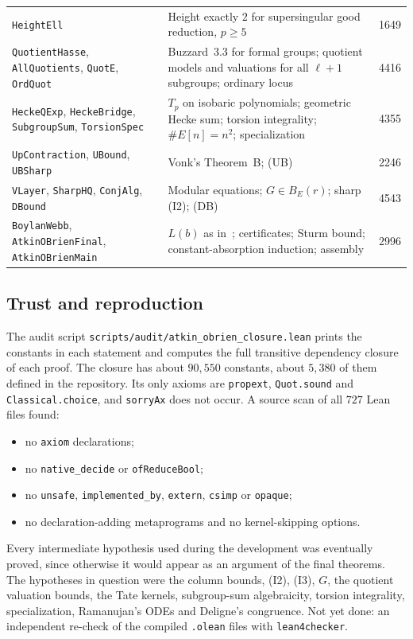 \documentclass[11pt]{amsart}
\newcommand{\lean}[1]{\texttt{#1}}
\theoremstyle{plain}
\theoremstyle{definition}
\numberwithin{equation}{section}
\begin{document}
\begin{table}[ht]
\begin{tabular}{@{}p{}p{}r@{}}
\lean{HeightEll} & Height exactly $2$ for supersingular good reduction, $p\ge5$ & 1649\\
\lean{QuotientHasse}, \lean{AllQuotients}, \lean{QuotE}, \lean{OrdQuot} & Buzzard~3.3 for formal groups; quotient models and valuations for all $\ell+1$ subgroups; ordinary locus & 4416\\
\lean{HeckeQExp}, \lean{HeckeBridge}, \lean{SubgroupSum}, \lean{TorsionSpec} & $T_p$ on isobaric polynomials; geometric Hecke sum; torsion integrality; $\#E[n]=n^2$; specialization & 4355\\
\lean{UpContraction}, \lean{UBound}, \lean{UBSharp} & Vonk's Theorem~B; (UB) & 2246\\
\lean{VLayer}, \lean{SharpHQ}, \lean{ConjAlg}, \lean{DBound} & Modular equations; $G\in B_E(r)$; sharp (I2); (DB) & 4543\\
\lean{BoylanWebb}, \lean{AtkinOBrienFinal}, \lean{AtkinOBrienMain} & $L(b)$ as in~\cite{BoylanWebb2013}; certificates; Sturm bound; constant-absorption induction; assembly & 2996\\
\bottomrule
\end{tabular}
\end{table}

\subsection{Trust and reproduction}
The audit script \lean{scripts/audit/atkin\_obrien\_closure.lean} prints the constants in each statement and computes the
full transitive dependency closure of each proof. The closure has about $90{,}550$ constants, about $5{,}380$ of them
defined in the repository. Its only axioms are \lean{propext}, \lean{Quot.sound} and \lean{Classical.choice}, and
\lean{sorryAx} does not occur. A source scan of all $727$ Lean files found:
\begin{itemize}
\item no \lean{axiom} declarations;
\item no \lean{native\_decide} or \lean{ofReduceBool};
\item no \lean{unsafe}, \lean{implemented\_by}, \lean{extern}, \lean{csimp} or \lean{opaque};
\item no declaration-adding metaprograms and no kernel-skipping options.
\end{itemize}
Every intermediate hypothesis used during the development was eventually proved, since otherwise it would appear as an
argument of the final theorems. The hypotheses in question were the column bounds, (I2), (I3), $G$, the quotient
valuation bounds, the Tate kernels, subgroup-sum algebraicity, torsion integrality, specialization, Ramanujan's ODEs and
Deligne's congruence. Not yet done: an independent re-check of the compiled \lean{.olean} files with
\lean{lean4checker}.
\end{document}
